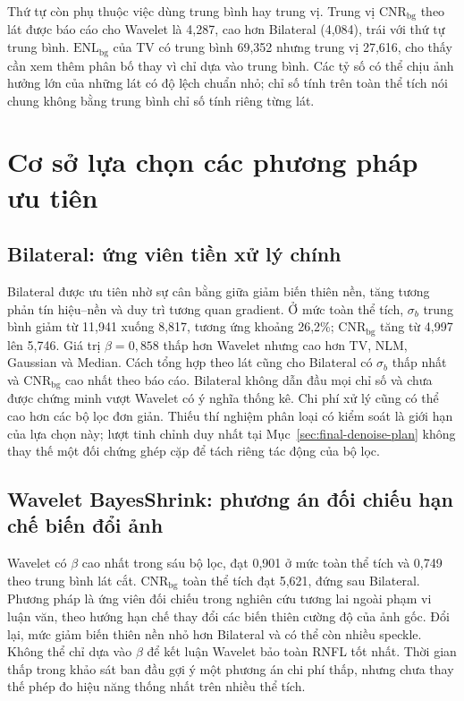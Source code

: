\documentclass[14pt,a4paper,oneside]{extreport}
\begin{document}
Thứ tự còn phụ thuộc việc dùng trung bình hay trung vị. Trung vị
$\mathrm{CNR}_{\mathrm{bg}}$ theo lát được báo cáo cho Wavelet là
4,287, cao hơn Bilateral (4,084), trái với thứ tự trung bình.
$\mathrm{ENL}_{\mathrm{bg}}$ của TV có trung bình 69,352 nhưng
trung vị 27,616, cho thấy cần xem thêm phân bố thay vì chỉ dựa vào
trung bình. Các tỷ số có thể chịu ảnh hưởng lớn của những lát có
độ lệch chuẩn nhỏ; chỉ số tính trên toàn thể tích nói chung không
bằng trung bình chỉ số tính riêng từng lát.
\FloatBarrier

\section{Cơ sở lựa chọn các phương pháp ưu tiên}
\label{sec:denoise-priority}
\subsection{Bilateral: ứng viên tiền xử lý chính}
Bilateral được ưu tiên nhờ sự cân bằng giữa giảm biến thiên nền,
tăng tương phản tín hiệu--nền và duy trì tương quan gradient.
Ở mức toàn thể tích, $\sigma_b$ trung bình giảm từ 11,941 xuống
8,817, tương ứng khoảng 26,2\%; $\mathrm{CNR}_{\mathrm{bg}}$ tăng
từ 4,997 lên 5,746. Giá trị $\beta=0{,}858$ thấp hơn Wavelet nhưng
cao hơn TV, NLM, Gaussian và Median. Cách tổng hợp theo lát cũng
cho Bilateral có $\sigma_b$ thấp nhất và $\mathrm{CNR}_{\mathrm{bg}}$
cao nhất theo báo cáo. Bilateral không dẫn đầu mọi chỉ số và chưa
được chứng minh vượt Wavelet có ý nghĩa thống kê. Chi phí xử lý
cũng có thể cao hơn các bộ lọc đơn giản. Thiếu thí nghiệm phân loại
có kiểm soát là giới hạn của lựa chọn này; lượt tinh chỉnh duy nhất tại
Mục~\ref{sec:final-denoise-plan} không thay thế một đối chứng ghép cặp
để tách riêng tác động của bộ lọc.

\subsection{Wavelet BayesShrink: phương án đối chiếu hạn chế biến đổi ảnh}
Wavelet có $\beta$ cao nhất trong sáu bộ lọc, đạt 0,901 ở mức toàn
thể tích và 0,749 theo trung bình lát cắt. $\mathrm{CNR}_{\mathrm{bg}}$
toàn thể tích đạt 5,621, đứng sau Bilateral. Phương pháp là ứng viên
đối chiếu trong nghiên cứu tương lai ngoài phạm vi luận văn, theo hướng hạn chế thay đổi các biến thiên
cường độ của ảnh gốc. Đổi lại, mức giảm biến thiên nền nhỏ hơn
Bilateral và có thể còn nhiều speckle. Không thể chỉ dựa vào
$\beta$ để kết luận Wavelet bảo toàn RNFL tốt nhất. Thời gian thấp
trong khảo sát ban đầu gợi ý một phương án chi phí thấp, nhưng
chưa thay thế phép đo hiệu năng thống nhất trên nhiều thể tích.
\end{document}
